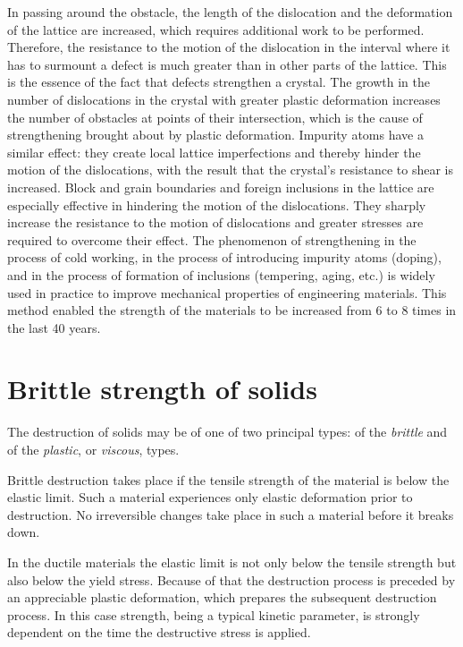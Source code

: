 In passing around the obstacle, the length of the dislocation and the deformation of the lattice are increased, which requires additional work to be performed. Therefore, the resistance to the motion of the dislocation in the interval where it has to surmount a defect is much greater than in other parts of the lattice. This is the essence of the fact that defects strengthen a crystal. The growth in the number of dislocations in the crystal with greater plastic deformation increases the number of obstacles at points of their intersection, which is the cause of strengthening brought about by plastic deformation. Impurity atoms have a similar effect: they create local lattice imperfections and thereby hinder the motion of the dislocations, with the result that the crystal's resistance to shear is increased. Block and grain boundaries and foreign inclusions in the lattice are especially effective in hindering the motion of the dislocations. They sharply increase the resistance to the motion of dislocations and greater stresses are required to overcome their effect. The phenomenon of strengthening in the process of cold working, in the process of introducing impurity atoms (doping), and in the process of formation of inclusions (tempering, aging, etc.) is widely used in practice to improve mechanical properties of engineering materials. This method enabled the strength of the materials to be increased from $6$ to $8$ times in the last 40 years.

\section{Brittle strength of solids}\label{sec:20}

The destruction of solids may be of one of two principal types: of the \textit{brittle} and of the \textit{plastic}, or \textit{viscous}, types.

Brittle destruction takes place if the tensile strength of the material is below the elastic limit. Such a material experiences only elastic deformation prior to destruction. No irreversible changes take place in such a material before it breaks down.

In the ductile materials the elastic limit is not only below the tensile strength but also below the yield stress. Because of that the destruction process is preceded by an appreciable plastic deformation, which prepares the subsequent destruction process. In this case strength, being a typical kinetic parameter, is strongly dependent on the time the destructive stress is applied.

